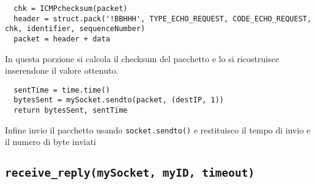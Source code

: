 \documentclass[a4paper,12pt]{report}
\begin{document}
\begin{verbatim}
  chk = ICMPchecksum(packet)
  header = struct.pack('!BBHHH', TYPE_ECHO_REQUEST, CODE_ECHO_REQUEST, chk, identifier, sequenceNumber)
  packet = header + data
\end{verbatim}
In questa porzione si calcola il checksum del pacchetto e lo si ricostruisce inserendone il valore ottenuto.
\begin{verbatim}
  sentTime = time.time()
  bytesSent = mySocket.sendto(packet, (destIP, 1))
  return bytesSent, sentTime
\end{verbatim}
Infine invio il pacchetto usando \texttt{socket.sendto()} e restituisco il tempo di invio e il numero di byte inviati
\subsection*{\texttt{receive_reply(mySocket, myID, timeout)}}
\end{document}
